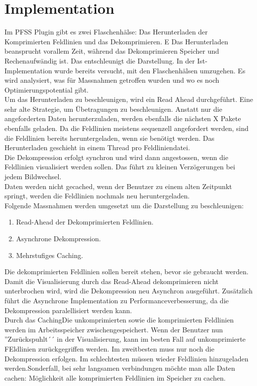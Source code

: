\section{Implementation}
Im PFSS Plugin gibt es zwei Flaschenhälse: Das Herunterladen der Komprimierten Feldlinien und das Dekomprimieren. E Das Herunterladen beansprucht vorallem Zeit, während das Dekomprimieren Speicher und Rechenaufwändig ist. Das entschleunigt die Darstellung. In der Ist-Implementation wurde bereits versucht, mit den Flaschenhälsen umzugehen. Es wird analysiert, was für Massnahmen getroffen wurden und wo es noch Optimierungspotential gibt.\\
[\baselineskip]
Um das Herunterladen zu beschleunigen, wird ein Read Ahead durchgeführt. Eine sehr alte Strategie, um Übetragungen zu beschleunigen. Anstatt nur die angeforderten Daten herunterzuladen, werden ebenfalls die nächsten X Pakete ebenfalls geladen. Da die Feldlinien meistens sequenzell angefordert werden, sind die Feldlinien bereits heruntergeladen, wenn sie benötigt werden. Das Herunterladen geschieht in einem Thread pro Feldliniendatei.\\
Die Dekompression erfolgt synchron und wird dann angestossen, wenn die Feldlinien visualisiert werden sollen. Das führt zu kleinen Verzögerungen bei jedem Bildwechsel.\\
Daten werden nicht gecached, wenn der Benutzer zu einem alten Zeitpunkt springt, werden die Feldlinien nochmals neu heruntergeladen.\\

Folgende Massnahmen werden umgesetzt um die Darstellung zu beschleunigen:
\begin{enumerate}
	\item Read-Ahead der Dekomprimierten Feldlinien.
	\item Asynchrone Dekompression.
	\item Mehrstufiges Caching.
\end{enumerate}
Die dekomprimierten Feldlinien sollen bereit stehen, bevor sie gebraucht werden.\\
Damit die Visualisierung durch das Read-Ahead dekomprimieren nicht unterbrochen wird, wird die Dekompression neu Asynchron ausgeführt. Zusätzlich führt die Asynchrone Implementation zu Performanceverbesserung, da die Dekompression paralellisiert werden kann.\\
Durch das CachingDie unkomprimierten sowie die komprimierten Feldlinien werden im Arbeitsspeicher zwischengespeichert. Wenn der Benutzer nun ''Zurückspuhlt´´ in der Visualisierung, kann im besten Fall auf unkomprimierte FEldlinien zurückgegriffen werden. Im zweitbesten muss nur noch die Dekompression erfolgen. Im schlechtesten müssen wieder Feldlinien hinzugeladen werden.Sonderfall, bei sehr langsamen verbindungen möchte man alle Daten cachen: Möglichkeit alle komprimierten Feldlinien im Speicher zu cachen.\\

